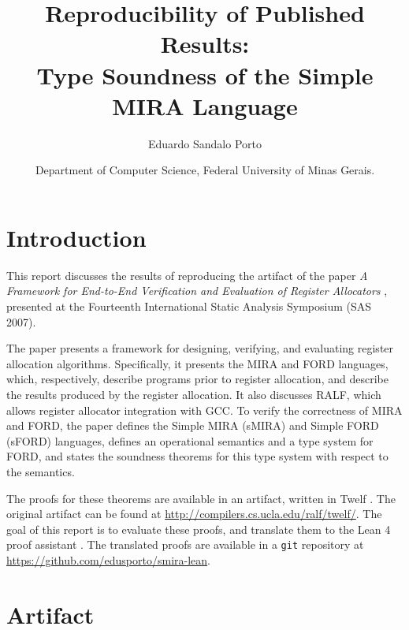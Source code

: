 \documentclass[]{NobArticle}
\title{Reproducibility of Published Results:\\
Type Soundness of the Simple MIRA Language}
\author{
    Eduardo Sandalo Porto
}
\date{
    Department of Computer Science, Federal University of Minas Gerais.
}
\begin{document}
\small
\maketitle

\section{Introduction}

This report discusses the results of reproducing the artifact of the paper \textit{A Framework for End-to-End Verification and Evaluation of Register Allocators} \cite{nandivada_framework_2007}, presented at the Fourteenth International Static Analysis Symposium (SAS 2007).

The paper presents a framework for designing, verifying, and evaluating register allocation algorithms. Specifically, it presents the MIRA and FORD languages, which, respectively, describe programs prior to register allocation, and describe the results produced by the register allocation. It also discusses RALF, which allows register allocator integration with GCC. To verify the correctness of MIRA and FORD, the paper defines the Simple MIRA (sMIRA) and Simple FORD (sFORD) languages, defines an operational semantics and a type system for FORD, and states the soundness theorems for this type system with respect to the semantics.

The proofs for these theorems are available in an artifact, written in Twelf \cite{pfenning_system_1999}. The original artifact can be found at \url{http://compilers.cs.ucla.edu/ralf/twelf/}. The goal of this report is to evaluate these proofs, and translate them to the Lean 4 proof assistant \cite{moura_lean_2021}. The translated proofs are available in a \texttt{git} repository at \url{https://github.com/edusporto/smira-lean}.

\section{Artifact}
\end{document}
